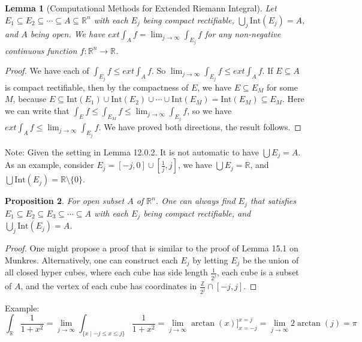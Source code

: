 \documentclass[15pt]{book}
\theoremstyle{break}
\theoremstyle{break}
\newtheorem{lem}{Lemma}[thm]
\newtheorem{prop}[lem]{Proposition}
\newcommand{\R}{\mathbb{R}}
\newcommand{\Z}{\mathbb{Z}}
\newcommand{\Int}{\text{Int}}
\newcommand{\note}{\color{red}Note: \color{black}}
\newcommand{\example}{\color{green}Example: \color{black}}
\begin{document}
\begin{lem}[Computational Methods for Extended Riemann Integral]
Let $E_1\subseteq E_2\subseteq \cdots \subseteq A\subseteq \R^n$ with each $E_j$ being compact rectifiable, $\bigcup_j \Int(E_j) = A$, and $A$ being open. We have $ext \int_A f = \lim_{j \to \infty} \int_{E_j} f$ for any non-negative continuous function $f:\R^n \to \R$. 
\end{lem}
\begin{proof}
We have each of $\int_{E_j} f \leq ext\int_A f$. So $\lim_{j\to \infty} \int_{E_j} f \leq ext \int_A f$. If $E\subseteq A$ is compact rectifiable, then by the compactness of $E$, we have $E\subseteq E_M$ for some $M$, because $E\subseteq \Int (E_1) \cup \Int(E_2) \cup \cdots \cup \Int(E_M) = \Int (E_M) \subseteq E_M$. Here we can write that $\int_E f \leq \int_{E_M} f \leq \lim_{j \to \infty} \int_{E_j} f$, so we have $ext \int_A f \leq \lim_{j \to \infty} \int_{E_j} f$. We have proved both directions, the result follows.
\end{proof}
\note Given the setting in Lemma 12.0.2. It is not automatic to have $\bigcup E_j = A$. As an example, consider $E_j = [-j,0] \cup [\frac{1}{j},j]$, we have $\bigcup E_j = \R$, and $\bigcup \Int(E_j) = \R\setminus \{0\}$. 

\begin{prop}
For open subset $A$ of $\R^n$. One can always find $E_j$ that satisfies $E_1\subseteq E_2\subseteq E_3\subseteq \cdots \subseteq A$ with each $E_j$ being compact rectifiable, and $\bigcup_j \Int(E_j) = A$.
\end{prop}
\begin{proof}
One might propose a proof that is similar to the proof of Lemma 15.1 on Munkres. Alternatively, one can construct each $E_j$ by letting $E_j$ be the union of all closed hyper cubes, where each cube has side length $\frac{1}{2^{j}}$, each cube is a subset of $A$, and the vertex of each cube has coordinates in $\frac{\Z}{2^j} \cap [-j, j]$.
\end{proof}

\hfill\break
\example $$\int_\R \frac{1}{1+x^2} = \lim_{j \to \infty} \int_{\{x \mid -j \leq x \leq j\}}\frac{1}{1+x^2} = \lim_{j\to \infty} \arctan(x)]_{x=-j}^{x=j} = \lim_{j \to \infty} 2\arctan(j) = \pi$$
\end{document}
